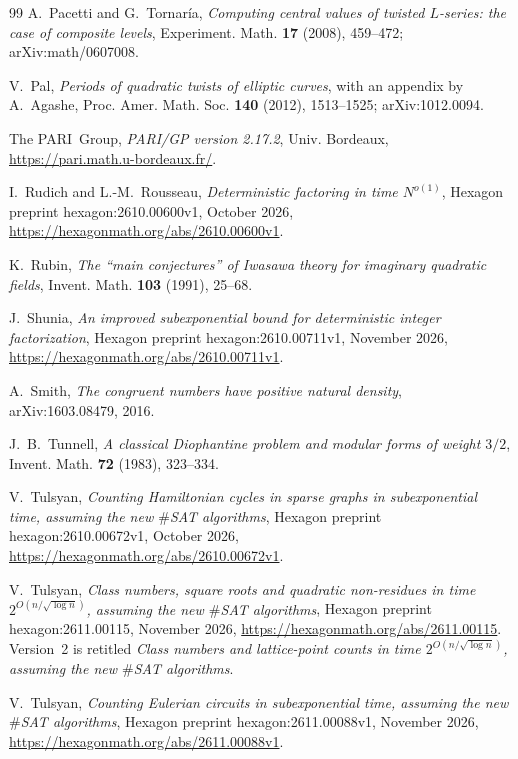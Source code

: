\documentclass[10pt]{amsart}
\theoremstyle{plain}
\theoremstyle{definition}
\theoremstyle{remark}
\numberwithin{equation}{section}
\begin{document}
\begin{thebibliography}{99}
A.~Pacetti and G.~Tornar\'ia, \emph{Computing central values of twisted {$L$}-series: the case of composite
levels}, Experiment. Math. \textbf{17} (2008), 459--472; arXiv:math/0607008.

V.~Pal, \emph{Periods of quadratic twists of elliptic curves}, with an appendix by A.~Agashe, Proc. Amer. Math.
Soc. \textbf{140} (2012), 1513--1525; arXiv:1012.0094.

The PARI~Group, \emph{PARI/GP version 2.17.2}, Univ. Bordeaux, \url{https://pari.math.u-bordeaux.fr/}.

I.~Rudich and L.-M.~Rousseau, \emph{Deterministic factoring in time $N^{o(1)}$}, Hexagon preprint
hexagon:2610.00600v1, October 2026, \url{https://hexagonmath.org/abs/2610.00600v1}.

K.~Rubin, \emph{The ``main conjectures'' of {I}wasawa theory for imaginary quadratic fields}, Invent. Math.
\textbf{103} (1991), 25--68.

J.~Shunia, \emph{An improved subexponential bound for deterministic integer factorization}, Hexagon preprint
hexagon:2610.00711v1, November 2026, \url{https://hexagonmath.org/abs/2610.00711v1}.

A.~Smith, \emph{The congruent numbers have positive natural density}, arXiv:1603.08479, 2016.

J.~B.~Tunnell, \emph{A classical {D}iophantine problem and modular forms of weight {$3/2$}}, Invent. Math.
\textbf{72} (1983), 323--334.

V.~Tulsyan, \emph{Counting {H}amiltonian cycles in sparse graphs in subexponential time, assuming the new
$\#${SAT} algorithms}, Hexagon preprint hexagon:2610.00672v1, October 2026,
\url{https://hexagonmath.org/abs/2610.00672v1}.

V.~Tulsyan, \emph{Class numbers, square roots and quadratic non-residues in time $2^{O(n/\sqrt{\log n})}$,
assuming the new $\#${SAT} algorithms}, Hexagon preprint hexagon:2611.00115, November 2026,
\url{https://hexagonmath.org/abs/2611.00115}. Version~2 is retitled \emph{Class numbers and lattice-point
counts in time $2^{O(n/\sqrt{\log n})}$, assuming the new $\#${SAT} algorithms}.

V.~Tulsyan, \emph{Counting {E}ulerian circuits in subexponential time, assuming the new $\#${SAT} algorithms},
Hexagon preprint hexagon:2611.00088v1, November 2026, \url{https://hexagonmath.org/abs/2611.00088v1}.


\end{thebibliography}
\end{document}
